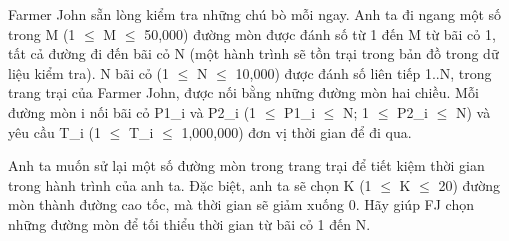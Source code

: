 Farmer John sẵn lòng kiểm tra những chú bò mỗi ngay. Anh ta đi ngang một số  trong M (1  $\le$  M  $\le$  50,000) đường mòn được đánh số từ 1 đến M từ bãi cỏ 1, tất  cả đường đi đến bãi cỏ N (một hành trình sẽ tồn trại trong bản đồ trong dữ  liệu kiểm tra). N bãi cỏ (1  $\le$  N  $\le$  10,000) được đánh số liên tiếp 1..N, trong  trang trại của Farmer John, được nối bằng những đường mòn hai chiều. Mỗi đường  mòn i nối bãi cỏ P1\_i và P2\_i (1  $\le$  P1\_i  $\le$  N; 1  $\le$  P2\_i  $\le$  N) và yêu cầu T\_i  (1  $\le$  T\_i  $\le$  1,000,000) đơn vị thời gian để đi qua.  

   Anh ta muốn sử lại một số đường mòn trong trang trại để tiết kiệm thời gian trong  hành trình của anh ta. Đặc biệt, anh ta sẽ chọn K (1  $\le$  K  $\le$  20) đường mòn thành  đường cao tốc, mà thời gian sẽ giảm xuống 0. Hãy giúp FJ chọn những đường mòn để  tối thiểu thời gian từ bãi cỏ 1 đến N.